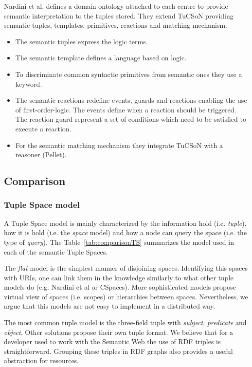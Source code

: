 Nardini et al. defines a domain ontology attached to each centre to provide semantic interpretation to the tuples stored.
They extend TuCSoN providing semantic tuples, templates, primitives, reactions and matching mechanism.
\begin{itemize}
  \item The semantic tuples express the logic terms.
  \item The semantic template defines a language based on logic.
  \item To discriminate common syntactic primitives from semantic ones they use a keyword.
  \item The semantic reactions redefine events, guards and reactions enabling the use of first-order-logic.
	The events define when a reaction should be triggered.
	The reaction guard represent a set of conditions which need to be satisfied to execute a reaction.
  \item For the semantic matching mechanism they integrate TuCSoN with a reasoner (Pellet). %
\end{itemize}



\subsection{Comparison}


\subsubsection{Tuple Space model}

A Tuple Space model is mainly characterized by the information hold (i.e. \emph{tuple}),
how it is hold (i.e. the \emph{space} model)
and how a node can query the space (i.e. the type of \emph{query}).
The Table~\ref{tab:comparisonTS} summarizes the model used in each of the semantic Tuple Spaces.

The \emph{flat} model is the simplest manner of disjoining spaces.
Identifying this spaces with URIs, one can link them in the knowledge similarly to what other tuple models do (e.g. Nardini et al or CSpaces). %
More sophisticated models propose virtual view of spaces (i.e. scopes) or hierarchies between spaces.
Nevertheless, we argue that this models are not easy to implement in a distributed way. %

The most common tuple model is the three-field tuple with \emph{subject}, \emph{predicate} and \emph{object}.
Other solutions propose their own tuple format.
We believe that for a developer used to work with the Semantic Web the use of RDF triples is straightforward.
Grouping these triples in RDF graphs also provides a useful abstraction for resources.

